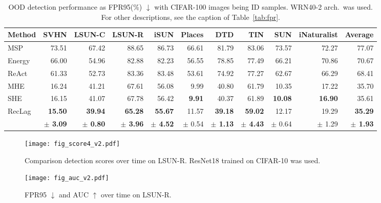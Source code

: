 \begin{table*}[t]
\centering
\setlength{\tabcolsep}{8.5pt}
{\footnotesize
\begin{tabular}{l|rrrrrrrrr|r}
\toprule
Method & SVHN & LSUN-C & LSUN-R & iSUN & Places & DTD & TIN & SUN & iNaturalist & Average \\
\midrule
MSP & 73.51 & 67.42 & 88.65 & 86.73 & 66.61 & 81.79 & 83.06 & 73.57 & 72.27 & 77.07\\
Energy & 66.00 & 54.96 & 82.88 & 82.23 & 56.55 & 78.85 & 77.49 & 66.21 & 70.86 & 70.67\\
ReAct & 61.33 & 52.73 & 83.36 & 83.48 & 53.61 & 74.92 & 77.27 & 62.67 & 66.29 & 68.41\\
MHE & 16.24 & 41.21 & 67.61 & 56.08 & 9.99 & 40.80 & 61.79 & 10.35 & 17.22 & 35.70\\
SHE & 16.15 & 41.07 & 67.78 & 56.42 & \textbf{9.91} & 40.37 & 61.89 & \textbf{10.08} & \textbf{16.90} & 35.61\\
RecLag & \textbf{15.50} & \textbf{39.94} & \textbf{65.28} & \textbf{55.67} & 11.57 & \textbf{39.18} & \textbf{59.02} & 12.17 & 19.29 & \textbf{35.29} \\
& \textbf{$\pm$ 3.09} & \textbf{$\pm$ 0.80} & \textbf{$\pm$ 3.96} & \textbf{$\pm$ 4.52} & $\pm$ 0.54 & \textbf{$\pm$ 1.13} & \textbf{$\pm$ 4.43} & $\pm$ 0.64 & $\pm$ 1.29 & \textbf{$\pm$ 1.93} \\
\bottomrule
\end{tabular}
}
\caption{OOD detection performance as
FPR95(\%) $\downarrow$ with CIFAR-100 images being ID samples.
WRN40-2 arch.~was used.
For other descriptions, see the caption of Table~\ref{tab:fpr}.
}
\label{tab:c100}
\end{table*}
\begin{figure}
\centering
\texttt{[image: fig\_score4\_v2.pdf]}
\caption{Comparison detection scores over time on LSUN-R. ResNet18 trained on CIFAR-10 was used.}
\label{fig:score}
\vspace{14pt}
\centering
\texttt{[image: fig\_auc\_v2.pdf]}
\caption{FPR95 $\downarrow$ and AUC $\uparrow$ over time on LSUN-R.}
\label{fig:auc}
\end{figure}

